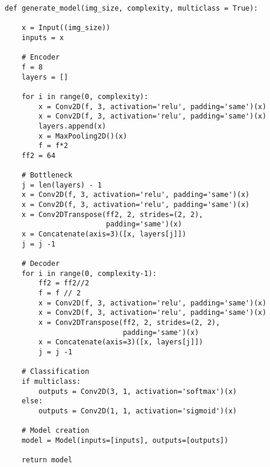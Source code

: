 \begin{lstlisting}[caption={U-Net},label={lst:unet},captionpos=b]
def generate_model(img_size, complexity, multiclass = True):

    x = Input((img_size))
    inputs = x

    # Encoder
    f = 8
    layers = []

    for i in range(0, complexity):
        x = Conv2D(f, 3, activation='relu', padding='same')(x)
        x = Conv2D(f, 3, activation='relu', padding='same')(x)
        layers.append(x)
        x = MaxPooling2D()(x)
        f = f*2
    ff2 = 64 

    # Bottleneck 
    j = len(layers) - 1
    x = Conv2D(f, 3, activation='relu', padding='same')(x)
    x = Conv2D(f, 3, activation='relu', padding='same')(x)
    x = Conv2DTranspose(ff2, 2, strides=(2, 2),
                        padding='same')(x)
    x = Concatenate(axis=3)([x, layers[j]])
    j = j -1 

    # Decoder 
    for i in range(0, complexity-1):
        ff2 = ff2//2
        f = f // 2 
        x = Conv2D(f, 3, activation='relu', padding='same')(x)
        x = Conv2D(f, 3, activation='relu', padding='same')(x)
        x = Conv2DTranspose(ff2, 2, strides=(2, 2),
                            padding='same')(x)
        x = Concatenate(axis=3)([x, layers[j]])
        j = j -1 

    # Classification
    if multiclass:
        outputs = Conv2D(3, 1, activation='softmax')(x)
    else:
        outputs = Conv2D(1, 1, activation='sigmoid')(x)

    # Model creation 
    model = Model(inputs=[inputs], outputs=[outputs])

    return model
\end{lstlisting}
\newpage

